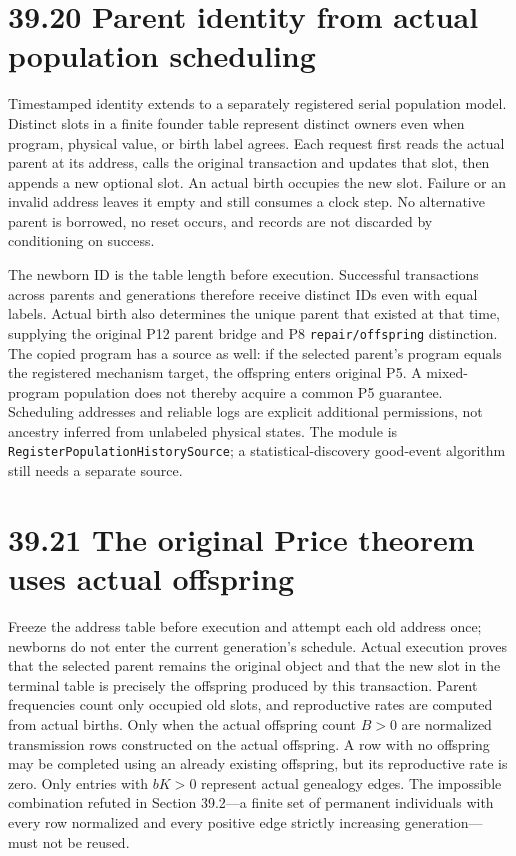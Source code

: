 \documentclass[
  english,
  11pt,
  oneside]{book}
\begin{document}
\section{39.20 Parent identity from actual population scheduling}\label{parent-identity-from-actual-population-scheduling}

Timestamped identity extends to a separately registered serial population model. Distinct slots in a finite founder table represent distinct owners even when program, physical value, or birth label agrees. Each request first reads the actual parent at its address, calls the original transaction and updates that slot, then appends a new optional slot. An actual birth occupies the new slot. Failure or an invalid address leaves it empty and still consumes a clock step. No alternative parent is borrowed, no reset occurs, and records are not discarded by conditioning on success.

The newborn ID is the table length before execution. Successful transactions across parents and generations therefore receive distinct IDs even with equal labels. Actual birth also determines the unique parent that existed at that time, supplying the original P12 parent bridge and P8 \nolinkurl{repair/offspring} distinction. The copied program has a source as well: if the selected parent's program equals the registered mechanism target, the offspring enters original P5. A mixed-program population does not thereby acquire a common P5 guarantee. Scheduling addresses and reliable logs are explicit additional permissions, not ancestry inferred from unlabeled physical states. The module is \nolinkurl{RegisterPopulationHistorySource}; a statistical-discovery good-event algorithm still needs a separate source.

\section{39.21 The original Price theorem uses actual offspring}\label{the-original-price-theorem-uses-actual-offspring}

Freeze the address table before execution and attempt each old address once; newborns do not enter the current generation's schedule. Actual execution proves that the selected parent remains the original object and that the new slot in the terminal table is precisely the offspring produced by this transaction. Parent frequencies count only occupied old slots, and reproductive rates are computed from actual births. Only when the actual offspring count \(B>0\) are normalized transmission rows constructed on the actual offspring. A row with no offspring may be completed using an already existing offspring, but its reproductive rate is zero. Only entries with \(bK>0\) represent actual genealogy edges. The impossible combination refuted in Section 39.2---a finite set of permanent individuals with every row normalized and every positive edge strictly increasing generation---must not be reused.
\end{document}
